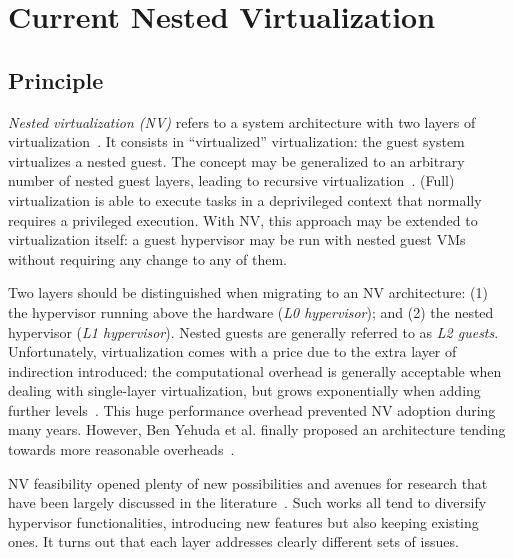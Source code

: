 \documentclass{sig-alternate}
\begin{document}
\section{Current Nested Virtualization}
\label{sec:classic}

\subsection{Principle}

\noindent \textit{Nested virtualization (NV)} refers to a system architecture with two layers of virtualization~\cite{turtle:ibm}. It consists in ``virtualized'' virtualization: the guest system virtualizes a nested guest. The concept may be generalized to an arbitrary number of nested guest layers, leading to recursive virtualization~\cite{rec:virt,Popek:1974:FRV:361011.361073}. (Full) virtualization is able to execute tasks in a deprivileged context that normally requires a privileged execution. With NV, this approach may be extended to virtualization itself: a guest hypervisor may be run with nested guest VMs without requiring any change to any of them.

Two layers should be distinguished when migrating to an NV architecture: (1) the hypervisor running above the hardware (\textit{L0 hypervisor}); and (2) the nested hypervisor (\textit{L1 hypervisor}). Nested guests are generally referred to as \textit{L2 guests}.
Unfortunately, virtualization comes with a price due to the extra layer of indirection introduced: the computational overhead is generally acceptable when dealing with single-layer virtualization, but grows exponentially when adding further levels~\cite{rec:virt}. This huge performance overhead prevented NV adoption during many years. However, Ben Yehuda et al. finally proposed an architecture tending towards more reasonable overheads~\cite{turtle:ibm}.

NV feasibility opened plenty of new possibilities and avenues for research that have been largely discussed in the literature~\cite{turtle:ibm,rec:virt,art:blan}. Such works all tend to diversify hypervisor functionalities, introducing new features but also keeping existing ones. It turns out that each layer addresses clearly different sets of issues.
\end{document}
